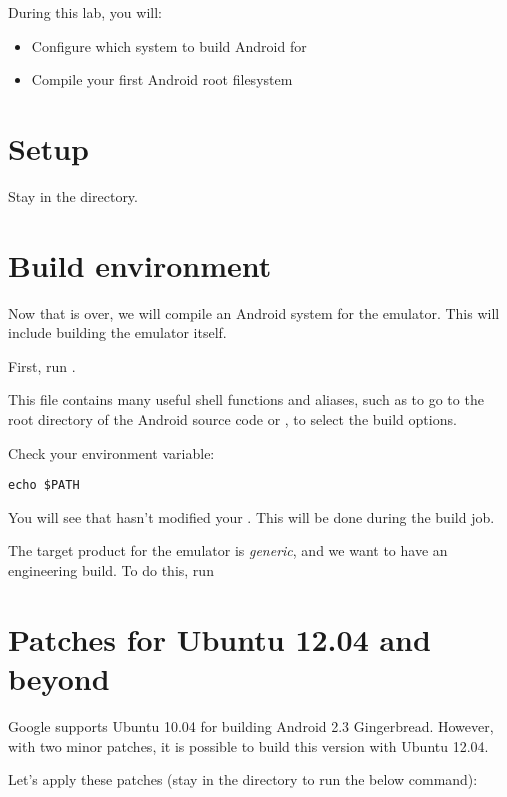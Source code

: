 
During this lab, you will:
\begin{itemize}
  \item Configure which system to build Android for
  \item Compile your first Android root filesystem
\end{itemize}

\section{Setup}

Stay in the  directory.

\section{Build environment}

Now that  is over, we will compile an Android system
for the emulator. This will include building the emulator itself.

First, run .

This file contains many useful shell functions and aliases, such as
 to go to the root directory of the Android source code or
, to select the build options.

Check your  environment variable:

\begin{verbatim}
echo $PATH
\end{verbatim}

You will see that  hasn't modified your
.  This will be done during the build job.

The target product for the emulator is {\it generic}, and we want to
have an engineering build. To do this, run 

\section{Patches for Ubuntu 12.04 and beyond}

Google supports Ubuntu 10.04 for building Android 2.3 Gingerbread.
However, with two minor patches, it is possible to build this version
with Ubuntu 12.04.

Let's apply these patches (stay in the  directory to run
the below command):

